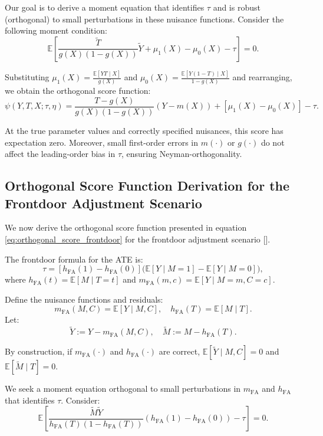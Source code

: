 \documentclass{article}
\numberwithin{equation}{section}
\begin{document}
Our goal is to derive a moment equation that identifies \(\tau\) and is robust (orthogonal) to small perturbations in these nuisance functions. Consider the following moment condition:
\[
\mathbb{E}\left[ \frac{\tilde{T}}{g(X)(1-g(X))}\tilde{Y} + \mu_1(X)-\mu_0(X) - \tau \right] = 0.
\]

Substituting \(\mu_1(X) = \frac{\mathbb{E}[Y T \mid X]}{g(X)}\) and \(\mu_0(X)=\frac{\mathbb{E}[Y (1 - T) \mid X]}{1 - g(X)}\) and rearranging, we obtain the orthogonal score function:
\[
\psi(Y, T, X; \tau, \eta) 
= \frac{T - g(X)}{g(X)(1-g(X))}(Y - m(X)) + [\mu_1(X) - \mu_0(X)] - \tau.
\]

At the true parameter values and correctly specified nuisances, this score has expectation zero. Moreover, small first-order errors in \(m(\cdot)\) or \(g(\cdot)\) do not affect the leading-order bias in \(\tau\), ensuring Neyman-orthogonality.

\newpage
\subsection{Orthogonal Score Function Derivation for the Frontdoor Adjustment Scenario}
\label{subsec:appendix_orthogonal_score_function_frontdoor_adjustment_reformatted}

We now derive the orthogonal score function presented in equation \eqref{eq:orthogonal_score_frontdoor} for the frontdoor adjustment scenario [\cite{ChernozhukovChetverikovDemireretal2018, Pearl2009}].

The frontdoor formula for the ATE is:
\[
\tau = [h_{\text{FA}}(1) - h_{\text{FA}}(0)]\bigl(\mathbb{E}[Y \mid M=1] - \mathbb{E}[Y \mid M=0]\bigr),
\]
where \(h_{\text{FA}}(t)=\mathbb{E}[M \mid T=t]\) and \(m_{\text{FA}}(m,c)=\mathbb{E}[Y \mid M=m, C=c]\).

Define the nuisance functions and residuals:
\[
m_{\text{FA}}(M,C) = \mathbb{E}[Y \mid M,C], \quad h_{\text{FA}}(T) = \mathbb{E}[M \mid T].
\]
Let:
\[
\tilde{Y} := Y - m_{\text{FA}}(M,C), \quad \tilde{M} := M - h_{\text{FA}}(T).
\]

By construction, if \(m_{\text{FA}}(\cdot)\) and \(h_{\text{FA}}(\cdot)\) are correct, \(\mathbb{E}[\tilde{Y} \mid M,C]=0\) and \(\mathbb{E}[\tilde{M} \mid T]=0\).

We seek a moment equation orthogonal to small perturbations in \(m_{\text{FA}}\) and \(h_{\text{FA}}\) that identifies \(\tau\). Consider:
\[
\mathbb{E}\left[ \frac{\tilde{M}\tilde{Y}}{h_{\text{FA}}(T)(1-h_{\text{FA}}(T))}(h_{\text{FA}}(1)-h_{\text{FA}}(0)) - \tau \right] = 0.
\]
\end{document}
